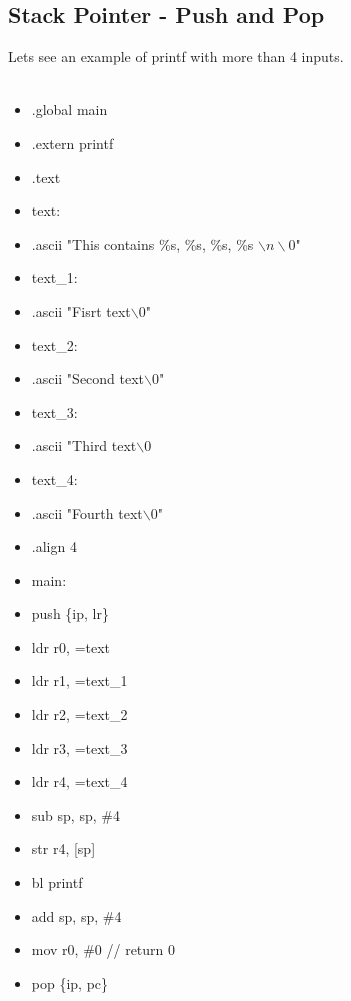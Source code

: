 \documentclass{article}
\begin{document}
	\subsection{Stack Pointer - Push and Pop}
	Lets see an example of printf with more than 4 inputs.\\\\
	\begin{itemize}
		\item[] .global main
		\item[] \qquad .extern printf
		
		\item[] .text
		\item[] text:
		\item[] \qquad .ascii "This contains \%s, \%s, \%s, \%s $\backslash n \backslash 0$"
		\item[] text\_1:
		\item[] \qquad .ascii "Fisrt text$\backslash 0$"
		\item[] text\_2:
		\item[] \qquad .ascii "Second text$\backslash 0$"
		\item[] text\_3:
		\item[] \qquad .ascii "Third text$\backslash 0$
		\item [] text\_4:
		\item[] \qquad .ascii "Fourth text$\backslash 0$"
		
		\item[] .align 4
		
		\item[] main:
		\item[] \qquad push \{ip, lr\}
		\item[] \qquad ldr r0, =text
		\item[] \qquad ldr r1, =text\_1
		\item[] \qquad ldr r2, =text\_2
		\item[] \qquad ldr r3, =text\_3
		\item[] \qquad ldr r4, =text\_4
		\item[] \qquad sub sp, sp, \#4
		\item[] \qquad str r4, [sp]
		\item[] \qquad bl printf
		\item[] \qquad add sp, sp, \#4
		\item[] \qquad mov r0, \#0 // return 0
		\item[] \qquad pop \{ip, pc\}
		
	\end{itemize}
\end{document}
